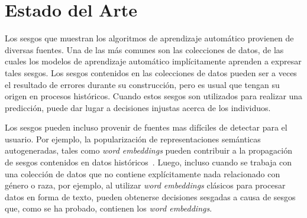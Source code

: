 \chapter{Estado del Arte}\label{chapter:state-of-the-art}


Los sesgos que muestran los algoritmos de aprendizaje automático provienen de diversas fuentes.
Una de las más comunes son las colecciones de datos, de las cuales los modelos de aprendizaje automático implícitamente aprenden a expresar tales sesgos.
Los sesgos contenidos en las colecciones de datos pueden ser a veces el resultado de errores durante su construcción, pero es usual que tengan su origen en procesos históricos.
Cuando estos sesgos son utilizados para realizar una predicción, puede dar lugar a decisiones injustas acerca de los individuos.

Los sesgos pueden incluso provenir de fuentes mas difíciles de detectar para el usuario.
Por ejemplo, la popularización de representaciones semánticas autogeneradas, tales como \emph{word embeddings} pueden contribuir a la propagación de sesgos contenidos en datos históricos~\parencite{bolukbasi2016man}.
Luego, incluso cuando se trabaja con una colección de datos que no contiene explícitamente nada relacionado con género o raza, por ejemplo, al utilizar \emph{word embeddings} clásicos para procesar datos en forma de texto, pueden obtenerse decisiones sesgadas a causa de sesgos que, como se ha probado, contienen los \emph{word embeddings}.

